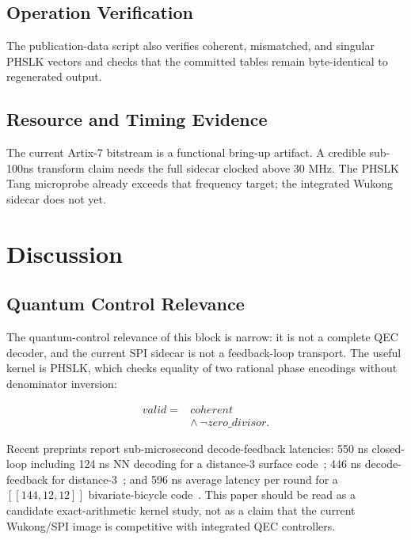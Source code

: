 \documentclass[conference]{IEEEtran}
\begin{document}
\subsection{Operation Verification}

\LucasOperationTable

The publication-data script also verifies coherent, mismatched, and singular
PHSLK vectors and checks that the committed tables remain byte-identical to
regenerated output.

\subsection{Resource and Timing Evidence}

\LucasResourceTable

\LucasPinvProfileTable

The current Artix-7 bitstream is a functional bring-up artifact. A credible sub-100ns transform claim needs the full sidecar clocked above 30 MHz. The PHSLK Tang microprobe already exceeds that frequency target; the integrated Wukong sidecar does not yet.

\section{Discussion}

\subsection{Quantum Control Relevance}

The quantum-control relevance of this block is narrow: it is not a complete QEC decoder, and the current SPI sidecar is not a feedback-loop transport. The useful kernel is PHSLK, which checks equality of two rational phase encodings without denominator inversion:

\begin{align*}
\mathit{valid} ={}& \mathit{coherent} \\
                  & \land\ \neg\mathit{zero\_divisor}.
\end{align*}

Recent preprints report sub-microsecond decode-feedback latencies: 550 ns closed-loop including 124 ns NN decoding for a distance-3 surface code~\cite{yang2026}; 446 ns decode-feedback for distance-3~\cite{liu2026}; and 596 ns average latency per round for a $[\![144,12,12]\!]$ bivariate-bicycle code~\cite{bascones2026}. This paper should be read as a candidate exact-arithmetic kernel study, not as a claim that the current Wukong/SPI image is competitive with integrated QEC controllers.
\end{document}
